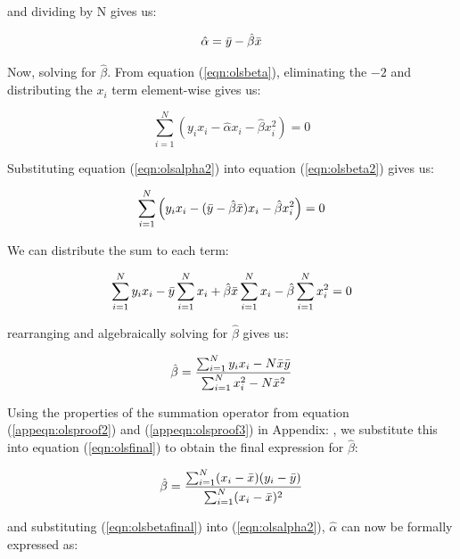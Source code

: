 \documentclass{article}
\begin{document}
\noindent and dividing by N gives us: 

\begin{equation}\label{eqn:olsalpha2}
    \hat{\alpha} = \Bar{y} - \hat{\beta}\Bar{x}
\end{equation}

\noindent Now, solving for $\hat{\beta}$. From equation (\ref{eqn:olsbeta}), eliminating the $-2$ and distributing the $x_i$ term element-wise gives us:

\begin{equation}\label{eqn:olsbeta2}
    \sum_{i=1}^N \left ( y_i x_i - \hat{\alpha}x_i - \hat{\beta} x_i^2 \right ) = 0
\end{equation}

\noindent Substituting equation (\ref{eqn:olsalpha2}) into equation (\ref{eqn:olsbeta2}) gives us: 

\begin{equation}
    \sum_{i=1}^N \left ( y_i x_i - (\Bar{y} - \hat{\beta}\Bar{x})x_i - \hat{\beta} x_i^2 \right ) = 0
\end{equation}

\noindent We can distribute the sum to each term:

\begin{equation}
    \sum_{i=1}^N y_i x_i - \Bar{y} \sum_{i=1}^N x_i + \hat{\beta}\Bar{x} \sum_{i=1}^N x_i - \hat{\beta} \sum_{i=1}^N x_i^2 = 0
\end{equation}

\noindent rearranging and algebraically solving for $\hat{\beta}$ gives us:

\begin{equation}\label{eqn:olsfinal}
    \hat{\beta} = \frac{\sum_{i=1}^N y_i x_i - N \Bar{x} \Bar{y}}{\sum_{i=1}^N x_i^2 - N \Bar{x}^2}
\end{equation}

\noindent Using the properties of the summation operator from equation (\ref{appeqn:olsproof2}) and (\ref{appeqn:olsproof3}) in Appendix: , we substitute this into equation (\ref{eqn:olsfinal}) to obtain the final expression for $\hat{\beta}$:

\begin{equation}\label{eqn:olsbetafinal}
    \hat{\beta} = \frac{\sum_{i=1}^N (x_i - \Bar{x})(y_i - \Bar{y})}{\sum_{i=1}^N (x_i - \Bar{x})^2}
\end{equation}

\noindent and substituting (\ref{eqn:olsbetafinal}) into (\ref{eqn:olsalpha2}), $\hat{\alpha}$ can now be formally expressed as: 
\end{document}
